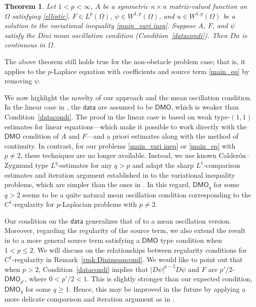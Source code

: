 \documentclass[reqno]{amsart}
\numberwithin{equation}{section}
\theoremstyle{plain}
\newtheorem{theorem}{Theorem}[section]
\theoremstyle{definition}
\theoremstyle{remark}
\begin{document}
\begin{theorem} \label{main_theorem}
Let $1<p<\infty$, $A$ be a symmetric $n\times n$ matrix-valued function on $\Omega$ satisfying \eqref{elliptic}, $F\in L^p(\Omega)$, $\psi\in W^{1,p}(\Omega)$, and $u \in W^{1,p}(\Omega)$ be a solution to the variational inequality \eqref{main_vari ineq}. Suppose $A$, $F$, and $\psi$ satisfy the Dini mean oscillation condition (Condition~\ref{datacondi}). Then $Du$ is continuous in $\Omega$.
\end{theorem}

The above theorem still holds true for the non-obstacle problem case; that is, it applies to the $p$-Laplace equation with coefficients and source term \eqref{main_eq} by removing $\psi$. 

We now highlight the novelty of our approach and the mean oscillation condition. 
In the linear case in \cite{DK17}, the $\mathsf{data}$ are assumed to be $\mathsf{DMO}$, which is weaker than Condition~\ref{datacondi}. The proof in the linear case is based on weak type-$(1,1)$ estimates for linear equations—which make it possible to work directly with the $\mathsf{DMO}$ condition of $A$ and $F$—and a priori estimates along with the method of continuity.
In contrast, for our problems \eqref{main_vari ineq} or \eqref{main_eq} with $p\neq 2$, these techniques are no longer available. Instead, we use known Calder\'on--Zygmund type $L^q$-estimates for any $q>p$ and adapt the sharp $L^1$-comparison estimates and iteration argument established in \cite{HLO25} to the variational inequality problems, which are simpler than the ones in \cite{KM14,Ok17}. In this regard, $\mathsf{DMO}_{q}$ for some $q>2$ seems to be a quite natural mean oscillation condition corresponding to the $C^1$-regularity for $p$-Laplacian problems with $p\neq 2$.

Our condition on the $\mathsf{data}$ generalizes that of \cite{Ok17} to a mean oscillation version. Moreover, regarding the regularity of the source term, we also extend the result in \cite{KM14} to a more general source term satisfying a $\mathsf{DMO}$ type condition when $1<p\le 2$.  We will discuss on the relationships between regularity conditions for $C^1$-regularity in Remark~\ref{rmk:Dinimeancond}. We would like to point out that when $p>2$, Condition~\ref{datacondi} implies that $|D\psi|^{p-2}D\psi$ and $F$ are $p'/2$-$\mathsf{DMO}_{p'}$, where $0<p'/2<1$. This is slightly stronger than our expected condition, $\mathsf{DMO}_{q}$ for some $q\geq 1$. Hence, this may be improved in the future by applying a more delicate comparison and iteration argument as in \cite{KM14}.
\end{document}
